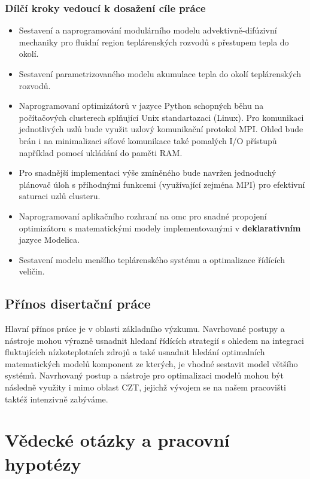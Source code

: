 \subsection*{Dílčí kroky vedoucí k dosažení cíle práce}
\begin{itemize}
  \item
    Sestavení a naprogramování modulárního modelu advektivně-difúzivní
    mechaniky pro fluidní region teplárenských rozvodů s přestupem tepla do
    okolí.
  \item
    Sestavení parametrizovaného modelu akumulace tepla do okolí teplárenských
    rozvodů.
  \item
    Naprogramovaní optimizátorů v jazyce Python schopných běhu na počítačových
    clusterech splňující Unix standartazaci (Linux). Pro komunikaci
    jednotlivých uzlů bude využit uzlový komunikační protokol MPI. Ohled bude
    brán i na minimalizaci síťové komunikace také pomalých I/O přístupů
    například pomocí ukládání do paměti RAM.
  \item
    Pro snadnější implementaci výše zmíněného bude navržen jednoduchý plánovač
    úloh s příhodnými funkcemi (využívající zejména MPI) pro efektivní saturaci
    uzlů clusteru.
  \item
    Naprogramovaní aplikačního rozhraní na \acrshort{omc} pro snadné propojení
    optimizátoru s matematickými modely implementovanými v
    \textbf{deklarativním} jazyce Modelica.
  \item
    Sestavení modelu menšího teplárenského systému a optimalizace řídících
    veličin.
\end{itemize}
\section{Přínos disertační práce}
\label{sec:prinos}
Hlavní přínos práce je v oblasti základního výzkumu. Navrhované postupy a
nástroje mohou výrazně usnadnit hledaní řídících strategií s ohledem na
integraci fluktujících nízkoteplotních zdrojů a také usnadnit hledání
optimalních matematických modelů komponent ze kterých, je vhodné sestavit model
většího systémů. Navrhovaný postup a nástroje pro optimalizaci modelů mohou být
následně využity i mimo oblast CZT, jejichž vývojem se na našem pracovišti
taktéž intenzivně zabýváme.

\chapter{Vědecké otázky a pracovní hypotézy}
\label{chap:SciQaH}
